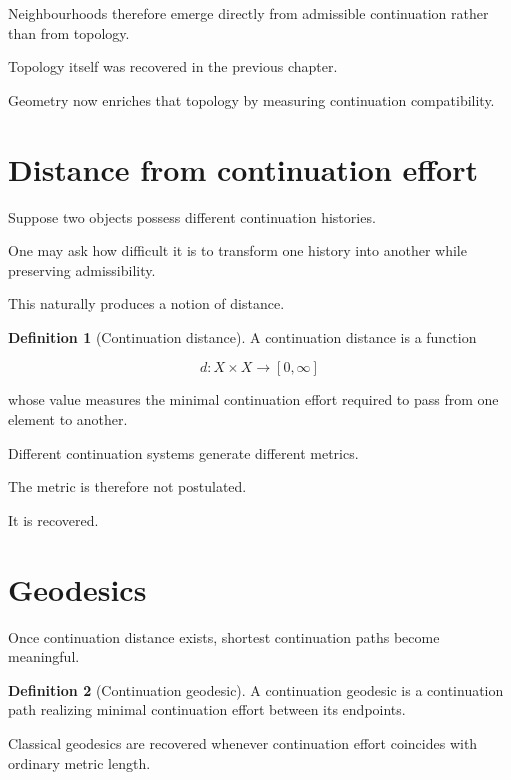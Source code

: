 \documentclass[13pt,openany]{book}
\theoremstyle{plain}
\theoremstyle{definition}
\newtheorem{definition}{Definition}[chapter]
\begin{document}
Neighbourhoods therefore emerge directly from admissible continuation rather
than from topology.

Topology itself was recovered in the previous chapter.

Geometry now enriches that topology by measuring continuation compatibility.

\section{Distance from continuation effort}

Suppose two objects possess different continuation histories.

One may ask how difficult it is to transform one history into another while
preserving admissibility.

This naturally produces a notion of distance.

\begin{definition}[Continuation distance]
A continuation distance is a function

\[
d:X\times X\rightarrow[0,\infty]
\]

whose value measures the minimal continuation effort required to pass from one
element to another.
\end{definition}

Different continuation systems generate different metrics.

The metric is therefore not postulated.

It is recovered.

\section{Geodesics}

Once continuation distance exists, shortest continuation paths become
meaningful.

\begin{definition}[Continuation geodesic]
A continuation geodesic is a continuation path realizing minimal continuation
effort between its endpoints.
\end{definition}

Classical geodesics are recovered whenever continuation effort coincides with
ordinary metric length.
\end{document}
